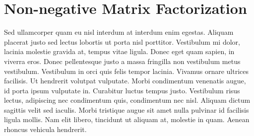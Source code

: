 
\section{Non-negative Matrix Factorization}

Sed ullamcorper quam eu nisl interdum at interdum enim egestas. Aliquam placerat justo sed lectus lobortis ut porta nisl porttitor. Vestibulum mi dolor, lacinia molestie gravida at, tempus vitae ligula. Donec eget quam sapien, in viverra eros. Donec pellentesque justo a massa fringilla non vestibulum metus vestibulum. Vestibulum in orci quis felis tempor lacinia. Vivamus ornare ultrices facilisis. Ut hendrerit volutpat vulputate. Morbi condimentum venenatis augue, id porta ipsum vulputate in. Curabitur luctus tempus justo. Vestibulum risus lectus, adipiscing nec condimentum quis, condimentum nec nisl. Aliquam dictum sagittis velit sed iaculis. Morbi tristique augue sit amet nulla pulvinar id facilisis ligula mollis. Nam elit libero, tincidunt ut aliquam at, molestie in quam. Aenean rhoncus vehicula hendrerit.

